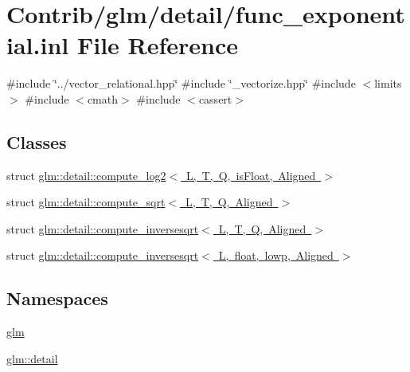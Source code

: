 \hypertarget{func__exponential_8inl}{}\section{Contrib/glm/detail/func\+\_\+exponential.inl File Reference}
\label{func__exponential_8inl}
{\ttfamily \#include \char`\"{}../vector\+\_\+relational.\+hpp\char`\"{}}\newline
{\ttfamily \#include \char`\"{}\+\_\+vectorize.\+hpp\char`\"{}}\newline
{\ttfamily \#include $<$limits$>$}\newline
{\ttfamily \#include $<$cmath$>$}\newline
{\ttfamily \#include $<$cassert$>$}\newline
\subsection*{Classes}
\begin{DoxyCompactItemize}
\item 
struct \mbox{\hyperlink{structglm_1_1detail_1_1compute__log2}{glm\+::detail\+::compute\+\_\+log2$<$ L, T, Q, is\+Float, Aligned $>$}}
\item 
struct \mbox{\hyperlink{structglm_1_1detail_1_1compute__sqrt}{glm\+::detail\+::compute\+\_\+sqrt$<$ L, T, Q, Aligned $>$}}
\item 
struct \mbox{\hyperlink{structglm_1_1detail_1_1compute__inversesqrt}{glm\+::detail\+::compute\+\_\+inversesqrt$<$ L, T, Q, Aligned $>$}}
\item 
struct \mbox{\hyperlink{structglm_1_1detail_1_1compute__inversesqrt_3_01_l_00_01float_00_01lowp_00_01_aligned_01_4}{glm\+::detail\+::compute\+\_\+inversesqrt$<$ L, float, lowp, Aligned $>$}}
\end{DoxyCompactItemize}
\subsection*{Namespaces}
\begin{DoxyCompactItemize}
\item 
 \mbox{\hyperlink{namespaceglm}{glm}}
\item 
 \mbox{\hyperlink{namespaceglm_1_1detail}{glm\+::detail}}
\end{DoxyCompactItemize}
